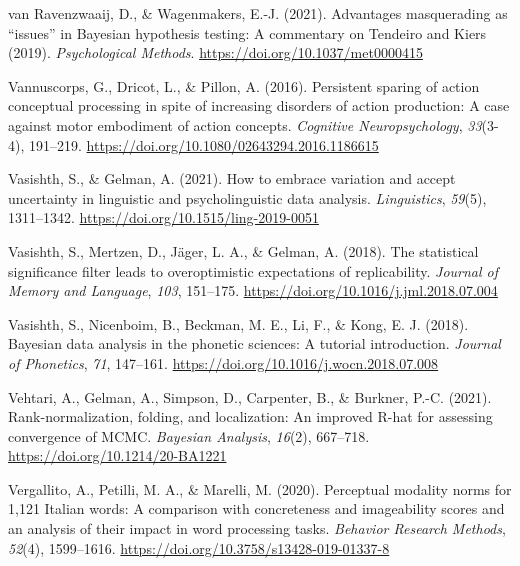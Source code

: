 \documentclass[
  12pt,
  man,floatsintext]{apa7}
\newlength{\cslhangindent}
\newlength{\cslentryspacingunit} %
\newenvironment{CSLReferences}[2] %
 {%
  \setlength{\parindent}{0pt}
  \ifodd #1
  \let\oldpar\par
  \def\par{\hangindent=\cslhangindent\oldpar}
  \fi
  \setlength{\parskip}{#2\cslentryspacingunit}
 }%
 {}
\begin{document}
\begin{CSLReferences}{1}{0}
\leavevmode{}%
van Ravenzwaaij, D., \& Wagenmakers, E.-J. (2021). Advantages masquerading as {``issues''} in {Bayesian} hypothesis testing: {A} commentary on {Tendeiro} and {Kiers} (2019). \emph{Psychological Methods}. \url{https://doi.org/10.1037/met0000415}

\leavevmode{}%
Vannuscorps, G., Dricot, L., \& Pillon, A. (2016). Persistent sparing of action conceptual processing in spite of increasing disorders of action production: {A} case against motor embodiment of action concepts. \emph{Cognitive Neuropsychology}, \emph{33}(3-4), 191--219. \url{https://doi.org/10.1080/02643294.2016.1186615}

\leavevmode{}%
Vasishth, S., \& Gelman, A. (2021). How to embrace variation and accept uncertainty in linguistic and psycholinguistic data analysis. \emph{Linguistics}, \emph{59}(5), 1311--1342. \url{https://doi.org/10.1515/ling-2019-0051}

\leavevmode{}%
Vasishth, S., Mertzen, D., Jäger, L. A., \& Gelman, A. (2018). The statistical significance filter leads to overoptimistic expectations of replicability. \emph{Journal of Memory and Language}, \emph{103}, 151--175. \url{https://doi.org/10.1016/j.jml.2018.07.004}

\leavevmode{}%
Vasishth, S., Nicenboim, B., Beckman, M. E., Li, F., \& Kong, E. J. (2018). Bayesian data analysis in the phonetic sciences: {A} tutorial introduction. \emph{Journal of Phonetics}, \emph{71}, 147--161. \url{https://doi.org/10.1016/j.wocn.2018.07.008}

\leavevmode{}%
Vehtari, A., Gelman, A., Simpson, D., Carpenter, B., \& Burkner, P.-C. (2021). Rank-normalization, folding, and localization: {An} improved {R-hat} for assessing convergence of {MCMC}. \emph{Bayesian Analysis}, \emph{16}(2), 667--718. \url{https://doi.org/10.1214/20-BA1221}

\leavevmode{}%
Vergallito, A., Petilli, M. A., \& Marelli, M. (2020). Perceptual modality norms for 1,121 {Italian} words: {A} comparison with concreteness and imageability scores and an analysis of their impact in word processing tasks. \emph{Behavior Research Methods}, \emph{52}(4), 1599--1616. \url{https://doi.org/10.3758/s13428-019-01337-8}


\end{CSLReferences}
\end{document}
